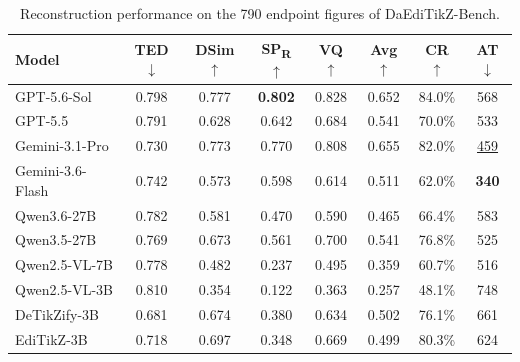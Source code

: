 \begin{table}[t]
\centering
\caption{Reconstruction performance on the 790 endpoint figures of DaEdiTikZ-Bench.}
\label{tab:detikzify_evaluation_full}
\small
\setlength{\tabcolsep}{5pt}
\renewcommand{\arraystretch}{0.95}

\begin{tabular}{lcccc:c:cc}
\toprule

\textbf{Model} &
\textbf{TED}$\downarrow$ &
\textbf{DSim}$\uparrow$ &
\textbf{SP\textsubscript{R}}$\uparrow$ &
\textbf{VQ}$\uparrow$ &
\textbf{Avg}$\uparrow$ &
\textbf{CR}$\uparrow$ &
\textbf{AT}$\downarrow$ \\
\midrule

GPT-5.6-Sol
& 0.798 & 0.777 & \textbf{0.802} & 0.828
& 0.652
& 84.0\% & 568 \\

GPT-5.5
& 0.791 & 0.628 & 0.642 & 0.684
& 0.541
& 70.0\% & 533 \\

Gemini-3.1-Pro
& 0.730 & 0.773 & 0.770 & 0.808
& 0.655
& 82.0\% & \underline{459} \\

Gemini-3.6-Flash
& 0.742 & 0.573 & 0.598 & 0.614
& 0.511
& 62.0\% & \textbf{340} \\

\midrule

Qwen3.6-27B
& 0.782 & 0.581 & 0.470 & 0.590
& 0.465
& 66.4\% & 583 \\

Qwen3.5-27B
& 0.769 & 0.673 & 0.561 & 0.700
& 0.541
& 76.8\% & 525 \\

Qwen2.5-VL-7B
& 0.778 & 0.482 & 0.237 & 0.495
& 0.359
& 60.7\% & 516 \\

\midrule

Qwen2.5-VL-3B
& 0.810 & 0.354 & 0.122 & 0.363
& 0.257
& 48.1\% & 748 \\

DeTikZify-3B
& 0.681 & 0.674 & 0.380 & 0.634
& 0.502
& 76.1\% & 661 \\

EdiTikZ-3B
& 0.718 & 0.697 & 0.348 & 0.669
& 0.499
& 80.3\% & 624 \\

\midrule


\end{tabular}
\end{table}
